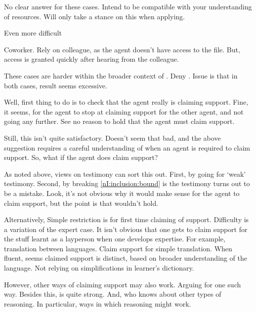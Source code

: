 \begin{note}
{    No clear answer for these cases.
    Intend to be compatible with your understanding of resources.
    Will only take a stance on this when applying.
  }
\end{note}

\begin{note}
  Even more difficult
\end{note}

\begin{note}
  Coworker.
  Rely on colleague, as the agent doesn't have access to the file.
  But, access is granted quickly after hearing from the colleague.
\end{note}

\begin{note}
  These cases are harder within the broader context of \nI{}.
  Deny \RBV{}.
  Issue is that in both cases, result seems excessive.

  Well, first thing to do is to check that the agent really is claiming support.
  Fine, it seems, for the agent to stop at claiming support for the other agent, and not going any further.
  See no reason to hold that the agent must claim support.

  Still, this isn't quite satisfactory.
  Doesn't seem that bad, and the above suggestion requires a careful understanding of when an agent is required to claim support.
  So, what if the agent does claim support?

  As noted above, views on testimony can sort this out.
  First, by going for `weak' testimony.
  Second, by breaking \ref{nI:inclusion:bound} is the testimony turns out to be a mistake.
  Look, it's not obvious why it would make sense for the agent to claim support, but the point is that \nI{} wouldn't hold.

  Alternatively, Simple restriction is for first time claiming of support.
  Difficulty is a variation of the expert case.
  It isn't obvious that one gets to claim support for the stuff learnt as a layperson when one develops expertise.
  For example, translation between languages.
  Claim support for simple translation.
  When fluent, seems claimed support is distinct, based on broader understanding of the language.
  Not relying on simplifications in learner's dictionary.

  However, other ways of claiming support may also work.
  Arguing for one such way.
  Besides this, \RBV{} is quite strong.
  And, who knows about other types of reasoning.
  In particular, ways in which reasoning \adA{} might work.
\end{note}

